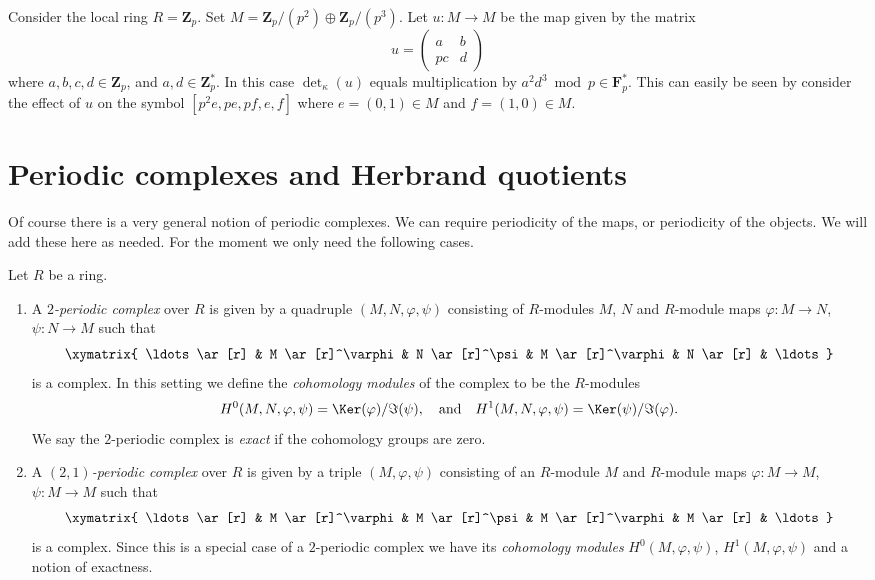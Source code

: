 \begin{example}
\label{example-determinant-map}
Consider the local ring $R = \mathbf{Z}_p$.
Set $M = \mathbf{Z}_p/(p^2) \oplus \mathbf{Z}_p/(p^3)$.
Let $u : M \to M$ be the map given by the matrix
$$
u =
\left(
\begin{matrix}
a & b \\
pc & d
\end{matrix}
\right)
$$
where $a, b, c, d \in \mathbf{Z}_p$, and $a, d \in \mathbf{Z}_p^*$.
In this case $\det_\kappa(u)$ equals multiplication by
$a^2d^3 \bmod p \in \mathbf{F}_p^*$. This can easily be seen
by consider the effect of $u$ on the symbol
$[p^2e, pe, pf, e, f]$ where $e = (0 , 1) \in M$ and
$f = (1, 0) \in M$.
\end{example}








\section{Periodic complexes and Herbrand quotients}
\label{section-periodic-complexes}

\noindent
Of course there is a very general notion of periodic complexes.
We can require periodicity of the maps, or periodicity of the objects.
We will add these here as needed. For the moment we only need
the following cases.

\begin{definition}
\label{definition-periodic-complex}
Let $R$ be a ring.
\begin{enumerate}
\item A {\it $2$-periodic complex} over $R$ is given
by a quadruple $(M, N, \varphi, \psi)$ consisting of
$R$-modules $M$, $N$ and $R$-module maps $\varphi : M \to N$,
$\psi : N \to M$ such that
$$
\xymatrix{
\ldots \ar[r] &
M \ar[r]^\varphi &
N \ar[r]^\psi &
M \ar[r]^\varphi &
N \ar[r] & \ldots
}
$$
is a complex. In this setting we define the {\it cohomology modules}
of the complex to be the $R$-modules
$$
H^0(M, N, \varphi, \psi) = \Ker(\varphi)/\Im(\psi)
, \quad\text{and}\quad
H^1(M, N, \varphi, \psi) = \Ker(\psi)/\Im(\varphi).
$$
We say the $2$-periodic complex is {\it exact} if the cohomology
groups are zero.
\item A {\it $(2, 1)$-periodic complex} over $R$ is given
by a triple $(M, \varphi, \psi)$ consisting of an $R$-module $M$ and
$R$-module maps $\varphi : M \to M$, $\psi : M \to M$
such that
$$
\xymatrix{
\ldots \ar[r] &
M \ar[r]^\varphi &
M \ar[r]^\psi &
M \ar[r]^\varphi &
M \ar[r] & \ldots
}
$$
is a complex. Since this is a special case of a $2$-periodic complex
we have its {\it cohomology modules} $H^0(M, \varphi, \psi)$,
$H^1(M, \varphi, \psi)$ and a notion of exactness.
\end{enumerate}
\end{definition}

